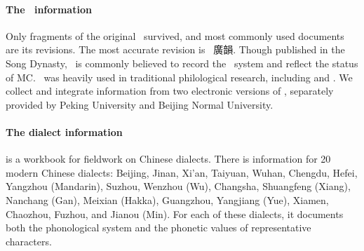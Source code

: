 \paragraph{The \qy~information}
Only fragments of the original \qy~survived, and most commonly used documents are its revisions. 
The most accurate revision is \gy~廣韻. 
Though published in the Song Dynasty, \gy~is commonly believed to record the \qy~system and reflect the status of MC. 
\gy~was heavily used in traditional philological research, including \citet{gbh} and \citet{wangli-1957}.
We collect and integrate information from two electronic versions of \gy, separately provided by Peking University and  Beijing Normal University.

\paragraph{The dialect information}
\citet{zihui} is a workbook for fieldwork on Chinese dialects.
There is information for 20 modern Chinese dialects: Beijing, Jinan, Xi'an, Taiyuan, Wuhan, Chengdu, Hefei, Yangzhou (Mandarin), Suzhou, Wenzhou (Wu), Changsha, Shuangfeng (Xiang), Nanchang (Gan), Meixian (Hakka), Guangzhou, Yangjiang (Yue), Xiamen, Chaozhou, Fuzhou, and Jianou (Min). 
For each of these dialects, it documents both the phonological system and the phonetic values of representative characters.

